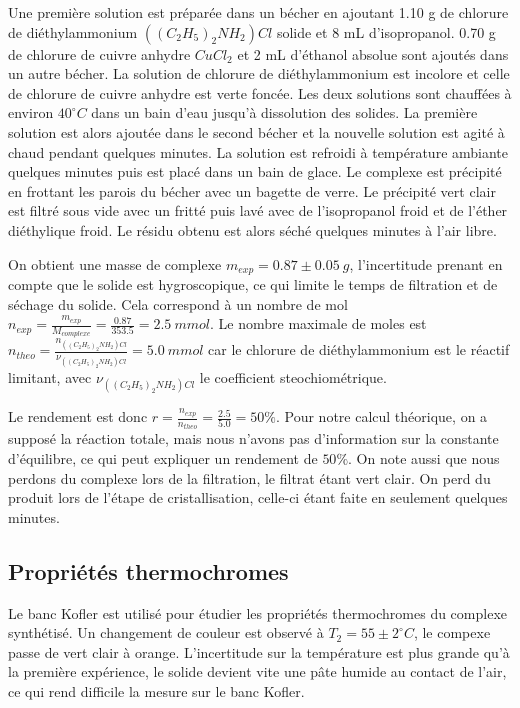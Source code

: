 \documentclass[12pt]{article}
\begin{document}
Une première solution est préparée dans un bécher en ajoutant 1.10 g de chlorure de diéthylammonium $((C_2H_5)_2NH_2)Cl$ solide et 8 mL d'isopropanol.
0.70 g de chlorure de cuivre anhydre $CuCl_2$ et 2 mL d'éthanol absolue sont ajoutés dans un autre bécher. La solution de chlorure de diéthylammonium est incolore et celle de chlorure de cuivre anhydre est verte foncée.
Les deux solutions sont chauffées à environ $40 ^\circ C$ dans un bain d'eau jusqu'à dissolution des solides.
La première solution est alors ajoutée dans le second bécher et la nouvelle solution est agité à chaud pendant quelques minutes.
La solution est refroidi à température ambiante quelques minutes puis est placé dans un bain de glace.
Le complexe est précipité en frottant les parois du bécher avec un bagette de verre.
Le précipité vert clair est filtré sous vide avec un fritté puis lavé avec de l'isopropanol froid et de l'éther diéthylique froid.
Le résidu obtenu est alors séché quelques minutes à l'air libre. 

On obtient une masse de complexe $m_{exp}=0.87 \pm 0.05\ g$, l'incertitude prenant en compte que le solide est hygroscopique, ce qui limite le temps de filtration et de séchage du solide.
Cela correspond à un nombre de mol $n_{exp}=\frac{m_{exp}}{M_{complexe}}=\frac{0.87}{353.5}= 2.5 \ mmol$. 
Le nombre maximale de moles est $n_{theo}=\frac{n_{((C_2H_5)_2NH_2)Cl}}{\nu_{((C_2H_5)_2NH_2)Cl}}=5.0 \ mmol$ car le chlorure de diéthylammonium est le réactif limitant, avec $\nu_{((C_2H_5)_2NH_2)Cl}$ le coefficient steochiométrique.

Le rendement est donc $r=\frac{n_{exp}}{n_{theo}}=\frac{2.5}{5.0}=50 \%$. 
Pour notre calcul théorique, on a supposé la réaction totale, mais nous n'avons pas d'information sur la constante d'équilibre, ce qui peut expliquer un rendement de $50 \%$.
On note aussi que nous perdons du complexe lors de la filtration, le filtrat étant vert clair.
On perd du produit lors de l'étape de cristallisation, celle-ci étant faite en seulement quelques minutes.


\subsection{Propriétés thermochromes}

Le banc Kofler est utilisé pour étudier les propriétés thermochromes du complexe synthétisé. 
Un changement de couleur est observé à $T_2=55 \pm 2 ^\circ C$, le compexe passe de vert clair à orange. 
L'incertitude sur la température est plus grande qu'à la première expérience, le solide devient vite une pâte humide au contact de l'air, ce qui rend difficile la mesure sur le banc Kofler.
\end{document}
